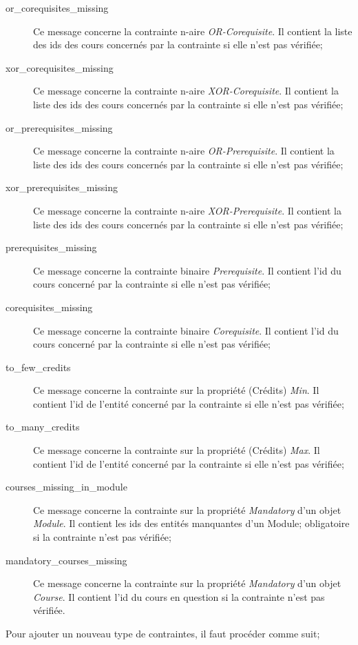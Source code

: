 \begin{description}
\item[or\_corequisites\_missing] Ce message concerne la contrainte n-aire \textit{OR-Corequisite}. Il contient la liste des ids des cours concernés par la contrainte si elle n'est pas vérifiée;
\item[xor\_corequisites\_missing] Ce message concerne la contrainte n-aire \textit{XOR-Corequisite}. Il contient la liste des ids des cours concernés par la contrainte si elle n'est pas vérifiée;
\item[or\_prerequisites\_missing] Ce message concerne la contrainte n-aire \textit{OR-Prerequisite}. Il contient la liste des ids des cours concernés par la contrainte si elle n'est pas vérifiée;
\item[xor\_prerequisites\_missing] Ce message concerne la contrainte n-aire \textit{XOR-Prerequisite}. Il contient la liste des ids des cours concernés par la contrainte si elle n'est pas vérifiée;
\item[prerequisites\_missing] Ce message concerne la contrainte binaire \textit{Prerequisite}. Il contient l'id du cours concerné par la contrainte si elle n'est pas vérifiée;
\item[corequisites\_missing] Ce message concerne la contrainte binaire \textit{Corequisite}. Il contient l'id du cours concerné par la contrainte si elle n'est pas vérifiée;
\item[to\_few\_credits] Ce message concerne la contrainte sur la propriété (Crédits) \textit{Min}. Il contient l'id de l'entité concerné par la contrainte si elle n'est pas vérifiée;
\item[to\_many\_credits] Ce message concerne la contrainte sur la propriété (Crédits) \textit{Max}. Il contient l'id de l'entité concerné par la contrainte si elle n'est pas vérifiée;
\item[courses\_missing\_in\_module] Ce message concerne la contrainte sur la propriété \textit{Mandatory} d'un objet \textit{Module}. Il contient les ids des entités manquantes d'un Module; obligatoire si la contrainte n'est pas vérifiée;  
\item[mandatory\_courses\_missing] Ce message concerne la contrainte sur la propriété \textit{Mandatory} d'un objet \textit{Course}. Il contient l'id du cours en question si la contrainte n'est pas vérifiée.
\end{description}

Pour ajouter un nouveau type de contraintes, il faut procéder comme suit;

